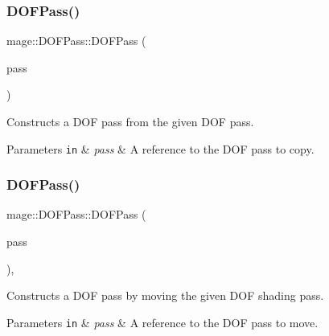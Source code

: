 \subsubsection{\texorpdfstring{D\+O\+F\+Pass()}{DOFPass()}\hspace{0.1cm}{\footnotesize\ttfamily [2/3]}}
{\footnotesize\ttfamily mage\+::\+D\+O\+F\+Pass\+::\+D\+O\+F\+Pass (\begin{DoxyParamCaption}\item[{const \hyperlink{classmage_1_1_d_o_f_pass}{D\+O\+F\+Pass} \&}]{pass }\end{DoxyParamCaption})\hspace{0.3cm}{\ttfamily [delete]}}

Constructs a D\+OF pass from the given D\+OF pass.


\begin{DoxyParams}[1]{Parameters}
\mbox{\tt in}  & {\em pass} & A reference to the D\+OF pass to copy. \\
\hline
\end{DoxyParams}
\hypertarget{classmage_1_1_d_o_f_pass_a1b40c130a685c9242029cc9d99db1795}{}\label{classmage_1_1_d_o_f_pass_a1b40c130a685c9242029cc9d99db1795} 
\subsubsection{\texorpdfstring{D\+O\+F\+Pass()}{DOFPass()}\hspace{0.1cm}{\footnotesize\ttfamily [3/3]}}
{\footnotesize\ttfamily mage\+::\+D\+O\+F\+Pass\+::\+D\+O\+F\+Pass (\begin{DoxyParamCaption}\item[{\hyperlink{classmage_1_1_d_o_f_pass}{D\+O\+F\+Pass} \&\&}]{pass }\end{DoxyParamCaption})\hspace{0.3cm}{\ttfamily [default]}, {\ttfamily [noexcept]}}

Constructs a D\+OF pass by moving the given D\+OF shading pass.


\begin{DoxyParams}[1]{Parameters}
\mbox{\tt in}  & {\em pass} & A reference to the D\+OF pass to move. \\
\hline
\end{DoxyParams}
\hypertarget{classmage_1_1_d_o_f_pass_a2a46bc7b2579f1d67fd412c89386d2f4}{}\label{classmage_1_1_d_o_f_pass_a2a46bc7b2579f1d67fd412c89386d2f4} 
